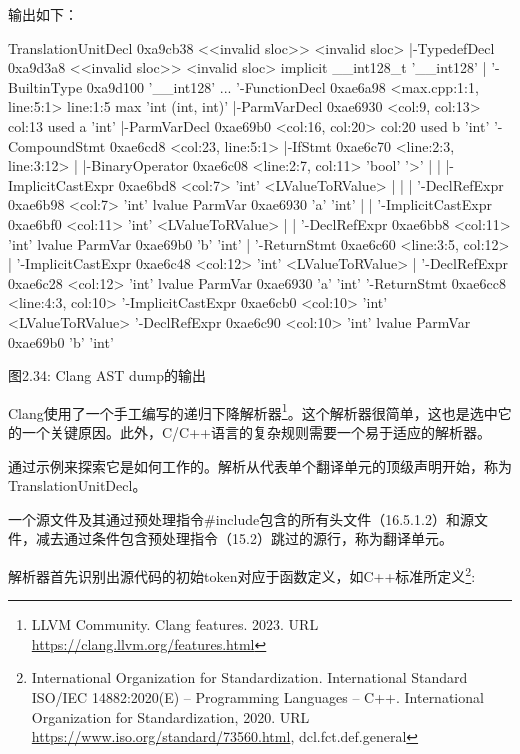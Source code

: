 输出如下：

\begin{shell}
TranslationUnitDecl 0xa9cb38 <<invalid sloc>> <invalid sloc>
|-TypedefDecl 0xa9d3a8 <<invalid sloc>> <invalid sloc>
implicit __int128_t '__int128'
| '-BuiltinType 0xa9d100 '__int128'
...
'-FunctionDecl 0xae6a98 <max.cpp:1:1, line:5:1> line:1:5 max
'int (int, int)'
  |-ParmVarDecl 0xae6930 <col:9, col:13> col:13 used a 'int'
  |-ParmVarDecl 0xae69b0 <col:16, col:20> col:20 used b 'int'
  '-CompoundStmt 0xae6cd8 <col:23, line:5:1>
    |-IfStmt 0xae6c70 <line:2:3, line:3:12>
    | |-BinaryOperator 0xae6c08 <line:2:7, col:11> 'bool' '>'
    | | |-ImplicitCastExpr 0xae6bd8 <col:7> 'int' <LValueToRValue>
    | | | '-DeclRefExpr 0xae6b98 <col:7> 'int' lvalue ParmVar 0xae6930
            'a' 'int'
    | | '-ImplicitCastExpr 0xae6bf0 <col:11> 'int' <LValueToRValue>
    | |   '-DeclRefExpr 0xae6bb8 <col:11> 'int' lvalue ParmVar 0xae69b0
            'b' 'int'
    | '-ReturnStmt 0xae6c60 <line:3:5, col:12>
    |   '-ImplicitCastExpr 0xae6c48 <col:12> 'int' <LValueToRValue>
    |     '-DeclRefExpr 0xae6c28 <col:12> 'int' lvalue ParmVar 0xae6930
            'a' 'int'
    '-ReturnStmt 0xae6cc8 <line:4:3, col:10>
      '-ImplicitCastExpr 0xae6cb0 <col:10> 'int' <LValueToRValue>
        '-DeclRefExpr 0xae6c90 <col:10> 'int' lvalue ParmVar 0xae69b0
            'b' 'int'
\end{shell}

\begin{center}
图2.34: Clang AST dump的输出
\end{center}

Clang使用了一个手工编写的递归下降解析器\footnote{LLVM Community. Clang features. 2023. URL \url{https://clang.llvm.org/features.html}}。这个解析器很简单，这也是选中它的一个关键原因。此外，C/C++语言的复杂规则需要一个易于适应的解析器。

通过示例来探索它是如何工作的。解析从代表单个翻译单元的顶级声明开始，称为TranslationUnitDecl。

一个源文件及其通过预处理指令\#include包含的所有头文件（16.5.1.2）和源文件，减去通过条件包含预处理指令（15.2）跳过的源行，称为翻译单元。

解析器首先识别出源代码的初始token对应于函数定义，如C++标准所定义\footnote{International Organization for Standardization. International Standard ISO/IEC 14882:2020(E) – Programming Languages – C++. International Organization for Standardization, 2020. URL \url{https://www.iso.org/standard/73560.html}, dcl.fct.def.general}:

